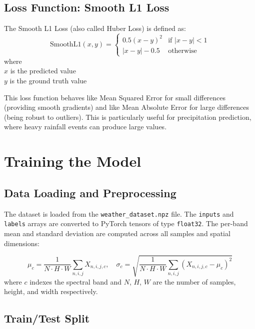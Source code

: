 \documentclass[12pt, a4paper]{report}
\begin{document}
\section{Loss Function: Smooth L1 Loss}

The Smooth L1 Loss (also called Huber Loss) is defined as:
\begin{equation}
    \text{SmoothL1}(x, y) = 
    \begin{cases}
        0.5 (x - y)^2 & \text{if } |x - y| < 1 \\
        |x - y| - 0.5 & \text{otherwise}
    \end{cases}
    \label{eq:smooth_l1}
\end{equation}
where \\
$x$ is the predicted value\\
$y$ is the ground truth value

This loss function behaves like Mean Squared Error for small differences (providing smooth gradients) and like Mean Absolute Error for large differences (being robust to outliers). This is particularly useful for precipitation prediction, where heavy rainfall events can produce large values.

\chapter{Training the Model}

\section{Data Loading and Preprocessing}

The dataset is loaded from the \texttt{weather\_dataset.npz} file. The \texttt{inputs} and \texttt{labels} arrays are converted to PyTorch tensors of type \texttt{float32}. The per-band mean and standard deviation are computed across all samples and spatial dimensions:

\begin{equation}
    \mu_c = \frac{1}{N \cdot H \cdot W} \sum_{n,i,j} X_{n,i,j,c}, \quad
    \sigma_c = \sqrt{\frac{1}{N \cdot H \cdot W} \sum_{n,i,j} (X_{n,i,j,c} - \mu_c)^2}
    \label{eq:mean_std}
\end{equation}
where $c$ indexes the spectral band and $N$, $H$, $W$ are the number of samples, height, and width respectively.

\section{Train/Test Split}
\end{document}
